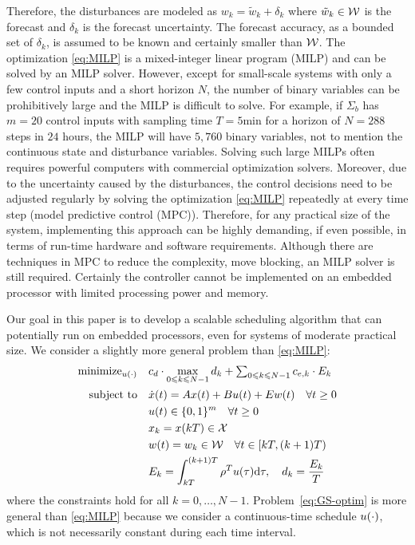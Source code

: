 Therefore, the disturbances are modeled as $w_{k} = \tilde{w}_{k} + \delta_{k}$ where $\tilde{w}_{k} \in \mathcal{W}$ is the forecast and $\delta_{k}$ is the forecast uncertainty.
The forecast accuracy, as a bounded set of $\delta_{k}$, is assumed to be known and certainly smaller than $\mathcal{W}$.
The optimization \eqref{eq:MILP} is a mixed-integer linear program (MILP) and can be solved by an MILP solver.
However, except for small-scale systems with only a few control inputs and a short horizon $N$, the number of binary variables can be prohibitively large and the MILP is difficult to solve.
For example, if $\Sigma_b$ has %
$m=20$ control inputs with sampling time $T = 5 \text{min}$ for a horizon of $N = 288$ steps in $24$ hours, the MILP will have $5 \comma 760$ binary variables, not to mention the continuous state and disturbance variables.
Solving such large MILPs often requires powerful computers with commercial optimization
solvers.
Moreover, due to the uncertainty caused by the disturbances, the control decisions need to be adjusted regularly by solving the optimization \eqref{eq:MILP} repeatedly at every time step (model predictive control (MPC)).
Therefore, for any practical size of the system, implementing this approach can be highly demanding, if even possible, in terms of run-time hardware and software requirements.
Although there are techniques in MPC to reduce the complexity, \eg move blocking, an MILP solver is still required.
Certainly the controller cannot be implemented on an embedded processor with limited processing power and memory.


Our goal in this paper is to develop a scalable %
scheduling algorithm that can potentially run on embedded processors, even for systems of moderate practical size.
We consider a slightly more general problem than \eqref{eq:MILP}:
\begin{align}
  \operatorname{minimize}_{u (\cdot)} \quad & c_d \cdot \max_{0 \leqslant k \leqslant
  N - 1} d_k + \textstyle\sum_{0 \leqslant k \leqslant N - 1} c_{e, k} \cdot E_k 
  \label{eq:GS-optim}\\
  \text{subject to} \quad
  & \dot{x} (t) = Ax (t) + Bu (t) + Ew (t) \quad \forall t \geq 0 \nonumber\\
  & u(t) \in \{0,1\}^{m} \quad \forall t \geq 0 \nonumber\\
  & x_{k} = x (kT) \in \mathcal{X} \nonumber\\
  & w (t) = w_{k} \in \mathcal{W} \quad \forall t \in [kT, (k + 1) T) \nonumber\\
  & E_k = \int_{kT}^{(k + 1) T} \rho^{T} u(\tau) \mathrm{d} \tau, \quad d_k = \frac{E_k}{T} \nonumber
\end{align}
where the constraints hold for all $k = 0, \ldots, N - 1$.
Problem~\eqref{eq:GS-optim} is more general than \eqref{eq:MILP} because we consider a
continuous-time schedule $u (\cdot)$, which is not necessarily constant
during each time interval.



